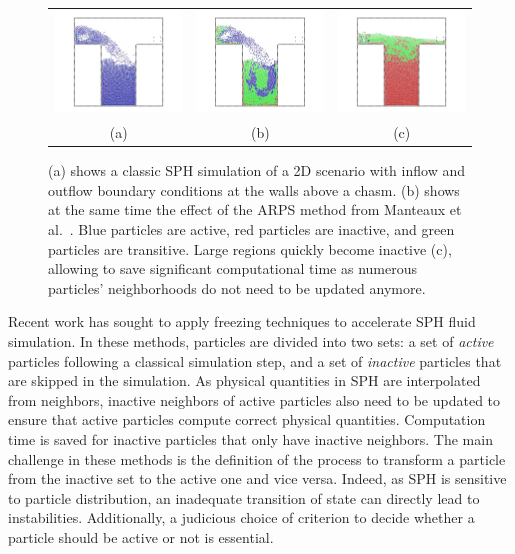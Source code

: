 \begin{figure}[t]
\centering
\begin{tabular}{ccc}
\includegraphics[width=.32\linewidth]{images/starAdaptivity-cgf2016/PermanentFlowSPH.png} &
\includegraphics[width=.32\linewidth]{images/starAdaptivity-cgf2016/PermanentFlowARPSColor.png} &
\includegraphics[width=.32\linewidth]{images/starAdaptivity-cgf2016/PermanentFlowARPSColor2.png} \\
(a) & (b) & (c)
\end{tabular}
\caption{\label{fig:SPHfreezing}
(a) shows a classic SPH simulation of a 2D scenario with inflow and outflow boundary conditions at the walls above a chasm. (b) shows at the same time the effect of the ARPS method from Manteaux et al.~\cite{Manteaux2013}. Blue particles are active, red particles are inactive, and green particles are transitive. Large regions quickly become inactive (c), allowing to save significant computational time as numerous particles' neighborhoods do not need to be updated anymore.}
\end{figure}

Recent work has sought to apply freezing techniques to accelerate SPH fluid simulation.
In these methods, particles are divided into two sets: a set of \emph{active} particles following a classical simulation step, and a set of \emph{inactive} particles that are skipped in the simulation.
As physical quantities in SPH are interpolated from neighbors, inactive neighbors of active particles also need to be updated to ensure that active particles compute correct physical quantities.
Computation time is saved for inactive particles that only have inactive neighbors.
The main challenge in these methods is the definition of the process to transform a particle from the inactive set to the active one and vice versa.
Indeed, as SPH is sensitive to particle distribution, an inadequate transition of state can directly lead to instabilities.
Additionally, a judicious choice of criterion to decide whether a particle should be active or not is essential.

